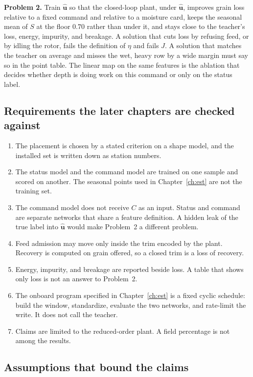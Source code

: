 \textbf{Problem 2.} Train \(\hat{\mathbf{u}}\) so that the closed-loop plant, under \(\hat{\mathbf{u}}\), improves grain loss relative to a fixed command and relative to a moisture card, keeps the seasonal mean of \(S\) at the floor \(0.70\) rather than under it, and stays close to the teacher's loss, energy, impurity, and breakage. A solution that cuts loss by refusing feed, or by idling the rotor, fails the definition of \(\eta\) and fails \(J\). A solution that matches the teacher on average and misses the wet, heavy row by a wide margin must say so in the point table. The linear map on the same features is the ablation that decides whether depth is doing work on this command or only on the status label.

\subsection{Requirements the later chapters are checked against}

\begin{enumerate}[label=R\arabic*.]
\item The placement is chosen by a stated criterion on a shape model, and the installed set is written down as station numbers.
\item The status model and the command model are trained on one sample and scored on another. The seasonal points used in Chapter~\ref{ch:est} are not the training set.
\item The command model does not receive \(C\) as an input. Status and command are separate networks that share a feature definition. A hidden leak of the true label into \(\hat{\mathbf{u}}\) would make Problem~2 a different problem.
\item Feed admission may move only inside the trim encoded by the plant. Recovery is computed on grain offered, so a closed trim is a loss of recovery.
\item Energy, impurity, and breakage are reported beside loss. A table that shows only loss is not an answer to Problem~2.
\item The onboard program specified in Chapter~\ref{ch:est} is a fixed cyclic schedule: build the window, standardize, evaluate the two networks, and rate-limit the write. It does not call the teacher.
\item Claims are limited to the reduced-order plant. A field percentage is not among the results.
\end{enumerate}

\subsection{Assumptions that bound the claims}

